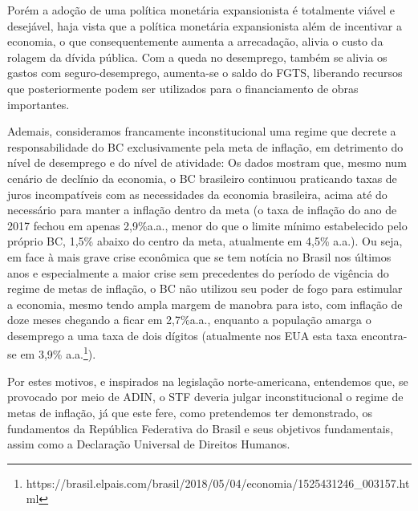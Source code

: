 \documentclass[
	10pt,				%
	openright,			%
	twoside,			%
	a5paper,			%
	english,			%
	french,				%
	spanish,			%
	brazil				%
	]{abntex2}
\begin{document}
Porém a adoção de uma política monetária expansionista é totalmente
viável e desejável, haja vista que a política monetária expansionista
além de incentivar a economia, o que consequentemente aumenta a
arrecadação, alivia o custo da rolagem da dívida pública. Com a queda no
desemprego, também se alivia os gastos com seguro-desemprego, aumenta-se
o saldo do FGTS, liberando recursos que posteriormente podem ser
utilizados para o financiamento de obras importantes.

Ademais, consideramos francamente inconstitucional uma regime que
decrete a responsabilidade do BC exclusivamente pela meta de inflação,
em detrimento do nível de desemprego e do nível de atividade: Os dados
mostram que, mesmo num cenário de declínio da economia, o BC brasileiro
continuou praticando taxas de juros incompatíveis com as necessidades da
economia brasileira, acima até do necessário para manter a inflação
dentro da meta (o taxa de inflação do ano de 2017 fechou em apenas
2,9\%a.a., menor do que o limite mínimo estabelecido pelo próprio BC,
1,5\% abaixo do centro da meta, atualmente em 4,5\% a.a.). Ou seja, em
face à mais grave crise econômica que se tem notícia no Brasil nos
últimos anos e especialmente a maior crise sem precedentes do período de
vigência do regime de metas de inflação, o BC não utilizou seu poder de
fogo para estimular a economia, mesmo tendo ampla margem de manobra para
isto, com inflação de doze meses chegando a ficar em 2,7\%a.a., enquanto
a população amarga o desemprego a uma taxa de dois dígitos (atualmente
nos EUA esta taxa encontra-se em 3,9\% a.a.\footnote{https://brasil.elpais.com/brasil/2018/05/04/economia/1525431246\_003157.html}).

Por estes motivos, e inspirados na legislação norte-americana,
entendemos que, se provocado por meio de ADIN, o STF deveria julgar
inconstitucional o regime de metas de inflação, já que este fere, como
pretendemos ter demonstrado, os fundamentos da República Federativa do
Brasil e seus objetivos fundamentais, assim como a Declaração Universal
de Direitos Humanos.

\postextual

\postextual



\end{document}
